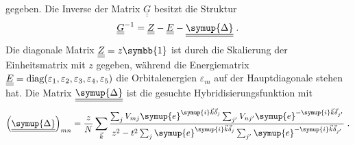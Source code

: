 gegeben.
Die Inverse der Matrix  $\underline{\underline{G}}$ besitzt die Struktur 
\begin{equation}
    \underline{\underline{G}}^{-1} = \underline{\underline{Z}} - \underline{\underline{E}} - \underline{\underline{\symup{\Delta}}} \; .
\end{equation}
Die diagonale Matrix $\underline{\underline{Z}} = z\symbb{1}$ ist durch die Skalierung der Einheitsmatrix mit $z$ gegeben, während die Energiematrix 
$\underline{\underline{E}} = \operatorname{diag}(\varepsilon_1, \varepsilon_2, \varepsilon_3, \varepsilon_4, \varepsilon_5)$
die Orbitalenergien $\varepsilon_m$ auf der Hauptdiagonale stehen hat.
Die Matrix $\underline{\underline{\symup{\Delta}}}$ ist die gesuchte Hybridisierungsfunktion mit 
\begin{equation*}
    \left ( \underline{\underline{\symup{\Delta}}} \right )_{mn} =  \frac{z}{N}\sum_{\vec{k}}
    \frac{\sum_j V_{mj}\symup{e}^{\symup{i}\vec{k}\vec{\delta}_j}\sum_{j'} V_{nj'}\symup{e}^{-\symup{i}\vec{k}\vec{\delta}_{j'}}}
    {z^2-t^2\sum_j \symup{e}^{\symup{i}\vec{k}\vec{\delta}_j} \sum_{j'} \symup{e}^{-\symup{i}\vec{k}\vec{\delta}_{j'}}} \; .
\end{equation*}

